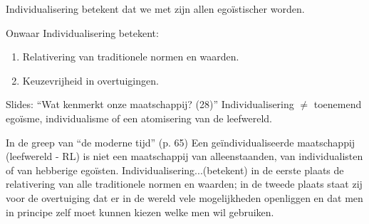 \documentclass[main.tex]{subfiles}
\begin{document}
\begin{examenvraag}
    \begin{stelling}
        Individualisering betekent dat we met zijn allen egoïstischer worden.
    \end{stelling}

    \begin{stelling-antwoord}{Onwaar}
        Individualisering betekent:
        \begin{enumerate}
            \item Relativering van traditionele normen en waarden.
            \item Keuzevrijheid in overtuigingen.
        \end{enumerate}
        \begin{citaat}{Slides: ``Wat kenmerkt onze maatschappij? (28)''}
            Individualisering $\neq$ toenemend ego\"isme, individualisme of een atomisering van de leefwereld.
        \end{citaat}
        \begin{citaat}{In de greep van ``de moderne tijd'' (p. 65)}
            Een ge\"individualiseerde maatschappij (leefwereld - RL) is niet een maatschappij van alleenstaanden, van individualisten of van hebberige ego\"isten.
            Individualisering...(betekent) in de eerste plaats de relativering van alle traditionele normen en waarden; in de tweede plaats staat zij voor de overtuiging dat er in de wereld vele mogelijkheden openliggen en dat men in principe zelf moet kunnen kiezen welke men wil gebruiken.
        \end{citaat}
    \end{stelling-antwoord}
\end{examenvraag}
\end{document}
